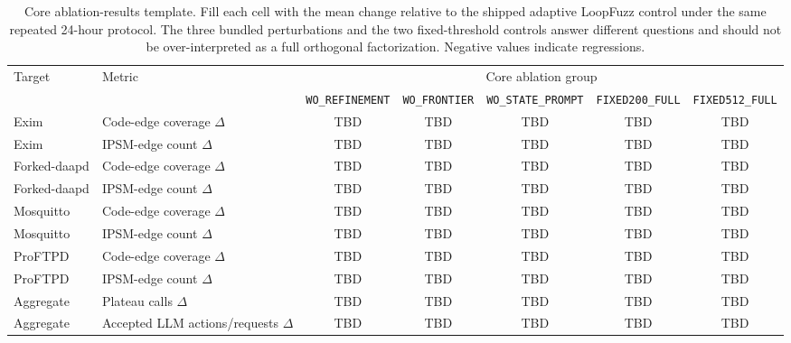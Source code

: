 \documentclass[conference]{IEEEtran}
\begin{document}
\begin{table}[t]
\centering
\caption{Core ablation-results template. Fill each cell with the mean change relative to the shipped adaptive LoopFuzz control under the same repeated 24-hour protocol. The three bundled perturbations and the two fixed-threshold controls answer different questions and should not be over-interpreted as a full orthogonal factorization. Negative values indicate regressions.}
\label{tab:ablation_results_template}
\scriptsize
\begin{tabular}{l l|c c c c c}
\toprule
\multirow{2}{*}{Target} & \multirow{2}{*}{Metric} & \multicolumn{5}{c}{Core ablation group} \\
& & \texttt{WO\_REFINEMENT} & \texttt{WO\_FRONTIER} & \texttt{WO\_STATE\_PROMPT} & \texttt{FIXED200\_FULL} & \texttt{FIXED512\_FULL} \\
\midrule
Exim & Code-edge coverage $\Delta$ & TBD & TBD & TBD & TBD & TBD \\
Exim & IPSM-edge count $\Delta$ & TBD & TBD & TBD & TBD & TBD \\
Forked-daapd & Code-edge coverage $\Delta$ & TBD & TBD & TBD & TBD & TBD \\
Forked-daapd & IPSM-edge count $\Delta$ & TBD & TBD & TBD & TBD & TBD \\
Mosquitto & Code-edge coverage $\Delta$ & TBD & TBD & TBD & TBD & TBD \\
Mosquitto & IPSM-edge count $\Delta$ & TBD & TBD & TBD & TBD & TBD \\
ProFTPD & Code-edge coverage $\Delta$ & TBD & TBD & TBD & TBD & TBD \\
ProFTPD & IPSM-edge count $\Delta$ & TBD & TBD & TBD & TBD & TBD \\
Aggregate & Plateau calls $\Delta$ & TBD & TBD & TBD & TBD & TBD \\
Aggregate & Accepted LLM actions/requests $\Delta$ & TBD & TBD & TBD & TBD & TBD \\
\bottomrule
\end{tabular}
\normalsize
\end{table}
\end{document}
